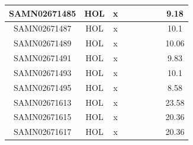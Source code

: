 \documentclass[../main.tex]{subfiles}
\begin{document}
\begin{flushleft}
\begin{footnotesize}
\begin{longtable}{|c|c|c|c|c|c|c|}
    \hline
    SAMN02671485  & HOL   & x                                                            & ~          & ~                                                                           & ~                                                                 & 9.18      \\ 
    \hline
    SAMN02671487  & HOL   & x                                                            & ~          & ~                                                                           & ~                                                                 & 10.1      \\ 
    \hline
    SAMN02671489  & HOL   & x                                                            & ~          & ~                                                                           & ~                                                                 & 10.06     \\ 
    \hline
    SAMN02671491  & HOL   & x                                                            & ~          & ~                                                                           & ~                                                                 & 9.83      \\ 
    \hline
    SAMN02671493  & HOL   & x                                                            & ~          & ~                                                                           & ~                                                                 & 10.1      \\ 
    \hline
    SAMN02671495  & HOL   & x                                                            & ~          & ~                                                                           & ~                                                                 & 8.58      \\ 
    \hline
    SAMN02671613  & HOL   & x                                                            & ~          & ~                                                                           & ~                                                                 & 23.58     \\ 
    \hline
    SAMN02671615  & HOL   & x                                                            & ~          & ~                                                                           & ~                                                                 & 20.36     \\ 
    \hline
    SAMN02671617  & HOL   & x                                                            & ~          & ~                                                                           & ~                                                                 & 20.36     \\ 

\end{longtable}
\end{footnotesize}
\end{flushleft}
\end{document}
